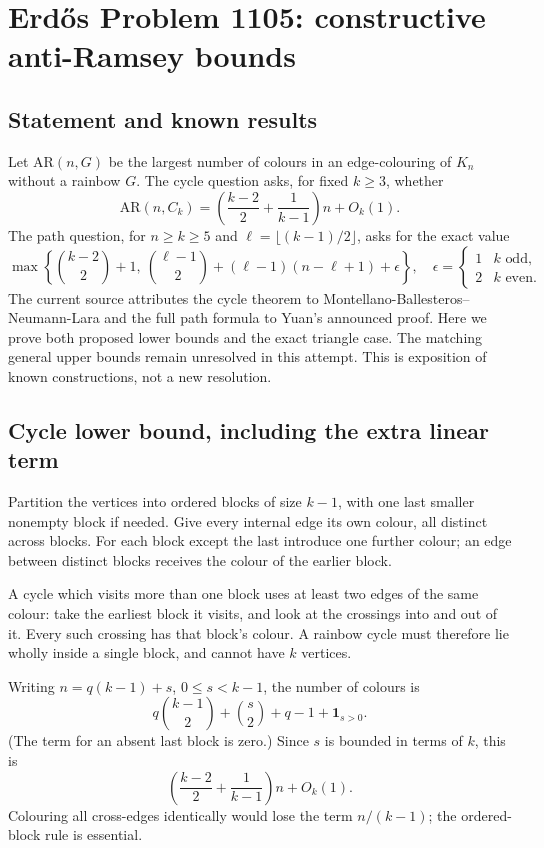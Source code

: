 \section*{Erd\H{o}s Problem 1105: constructive anti-Ramsey bounds}
\subsection*{Statement and known results}
Let $\mathrm{AR}(n,G)$ be the largest number of colours in an edge-colouring of $K_n$ without a rainbow $G$. The cycle question asks, for fixed $k\ge3$, whether
\[
 \mathrm{AR}(n,C_k)=\left(\frac{k-2}{2}+\frac1{k-1}\right)n+O_k(1).
\]
The path question, for $n\ge k\ge5$ and $\ell=\lfloor(k-1)/2\rfloor$, asks for the exact value
\[
 \max\left\{\binom{k-2}{2}+1,\
 \binom{\ell-1}{2}+(\ell-1)(n-\ell+1)+\epsilon\right\},
 \quad
 \epsilon=\begin{cases}1&k\text{ odd},\\2&k\text{ even}.\end{cases}
\]
The current source attributes the cycle theorem to Montellano-Ballesteros--Neumann-Lara and the full path formula to Yuan's announced proof. Here we prove both proposed lower bounds and the exact triangle case. The matching general upper bounds remain unresolved in this attempt. This is exposition of known constructions, not a new resolution.

\subsection*{Cycle lower bound, including the extra linear term}
Partition the vertices into ordered blocks of size $k-1$, with one last smaller nonempty block if needed. Give every internal edge its own colour, all distinct across blocks. For each block except the last introduce one further colour; an edge between distinct blocks receives the colour of the earlier block.

A cycle which visits more than one block uses at least two edges of the same colour: take the earliest block it visits, and look at the crossings into and out of it. Every such crossing has that block's colour. A rainbow cycle must therefore lie wholly inside a single block, and cannot have $k$ vertices.

Writing $n=q(k-1)+s$, $0\le s<k-1$, the number of colours is
\[
 q\binom{k-1}{2}+\binom{s}{2}+q-1+\mathbf1_{s>0}.
\]
(The term for an absent last block is zero.) Since $s$ is bounded in terms of $k$, this is
\[
 \left(\frac{k-2}{2}+\frac1{k-1}\right)n+O_k(1).
\]
Colouring all cross-edges identically would lose the term $n/(k-1)$; the ordered-block rule is essential.

